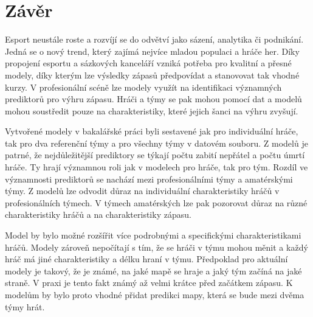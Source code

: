 \chapter{Závěr}
Esport neustále roste a rozvíjí se do odvětví jako sázení, analytika či podnikání. Jedná se o nový trend, který zajímá nejvíce mladou populaci a hráče her.
Díky propojení esportu a sázkových kanceláří vzniká potřeba pro kvalitní a přesné modely, díky kterým lze výsledky zápasů předpovídat a stanovovat tak
vhodné kurzy. V profesionální scéně lze modely využít na identifikaci významných prediktorů pro výhru zápasu. Hráči a týmy se pak mohou pomocí dat
a modelů mohou soustředit pouze na charakteristiky, které jejich šanci na výhru zvyšují.

Vytvořené modely v bakalářské práci byli sestavené jak pro individuální hráče, tak pro dva referenční týmy a pro všechny týmy v datovém souboru. Z modelů
je patrné, že nejdůležitější prediktory se týkají počtu zabití nepřátel a počtu úmrtí hráče. Ty hrají významnou roli jak v modelech pro hráče, tak pro tým.
Rozdíl ve významnosti prediktorů se nachází mezi profesionálními týmy a amatérskými týmy. Z modelů lze odvodit důraz na individuální charakteristiky hráčů
v profesionálních týmech. V týmech amatérských lze pak pozorovat důraz na různé charakteristiky hráčů a na charakteristiky zápasu. 

Model by bylo možné rozšířit více podrobnými a specifickými charakteristikami hráčů. Modely zároveň nepočítají s tím, že se hráči v týmu mohou měnit a každý hráč má jiné
charakteristiky a délku hraní v týmu. Předpoklad pro aktuální modely je takový, že je známé, na jaké mapě se hraje a jaký tým začíná na jaké straně. 
V praxi je tento fakt známý až velmi krátce před začátkem zápasu. K modelům by bylo proto vhodné přidat predikci mapy, která se bude mezi dvěma týmy hrát.